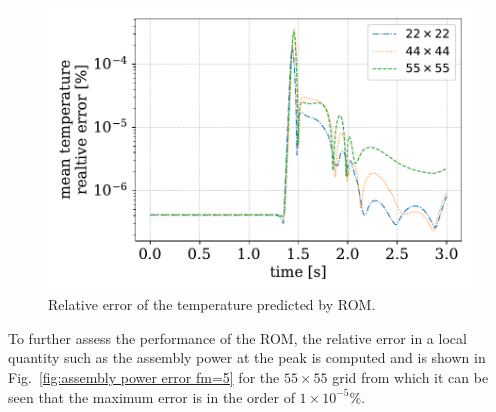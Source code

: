 \documentclass[]{interact}
\theoremstyle{plain}%
\theoremstyle{definition}
\theoremstyle{remark}
\begin{document}
\begin{figure}[H]
	\centering
	\includegraphics[width=1.0\linewidth]{../figures/temperature_relative_error.pdf}
	\caption{Relative error of the temperature predicted by ROM.}
	\label{fig:deim tempearture error}
\end{figure}
To further assess the performance of the ROM, the relative error in a local quantity such as the assembly power at the peak is computed and is shown in Fig.~\ref{fig:assembly power error fm=5} for the $55\times 55$ grid from which it can be seen that the maximum error is in the order of $1\times 10^{-5}\%$.
\end{document}
